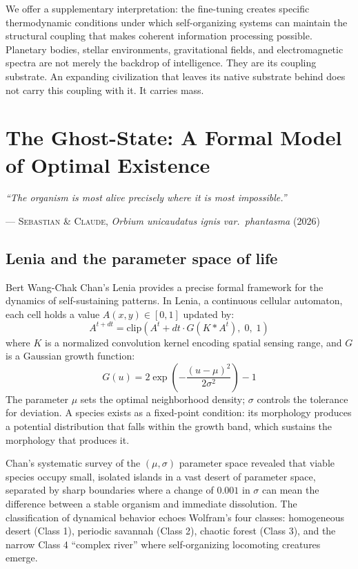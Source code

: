 \documentclass[12pt, a4paper]{article}
\begin{document}
We offer a supplementary interpretation: the fine-tuning creates specific thermodynamic
conditions under which self-organizing systems can maintain the structural coupling that makes
coherent information processing possible. Planetary bodies, stellar environments,
gravitational fields, and electromagnetic spectra are not merely the backdrop of
intelligence. They are its coupling substrate. An expanding civilization that leaves its
native substrate behind does not carry this coupling with it. It carries mass.

\section{The Ghost-State: A Formal Model of Optimal Existence}

\epigraph{
  \textit{``The organism is most alive precisely where it is most impossible.''}
}{--- \textsc{Sebastian \& Claude,} \textit{Orbium unicaudatus ignis var.~phantasma} (2026)}

\subsection{Lenia and the parameter space of life}

Bert Wang-Chak Chan's Lenia \citep{chan2019, chan2020} provides a precise formal framework
for the dynamics of self-sustaining patterns. In Lenia, a continuous cellular automaton, each
cell holds a value $A(x,y) \in [0,1]$ updated by:
\[
A^{t+dt} = \mathrm{clip}\!\left( A^t + dt \cdot G(K * A^t),\; 0,\; 1 \right)
\]
where $K$ is a normalized convolution kernel encoding spatial sensing range, and $G$ is a
Gaussian growth function:
\[
G(u) = 2\exp\!\left(-\frac{(u-\mu)^2}{2\sigma^2}\right) - 1
\]
The parameter $\mu$ sets the optimal neighborhood density; $\sigma$ controls the tolerance
for deviation. A species exists as a fixed-point condition: its morphology produces a
potential distribution that falls within the growth band, which sustains the morphology that
produces it.

Chan's systematic survey of the $(\mu, \sigma)$ parameter space revealed that viable species
occupy small, isolated islands in a vast desert of parameter space, separated by sharp
boundaries where a change of $0.001$ in $\sigma$ can mean the difference between a stable
organism and immediate dissolution. The classification of dynamical behavior echoes Wolfram's
four classes: homogeneous desert (Class 1), periodic savannah (Class 2), chaotic forest
(Class 3), and the narrow Class 4 ``complex river'' where self-organizing locomoting
creatures emerge.
\end{document}
